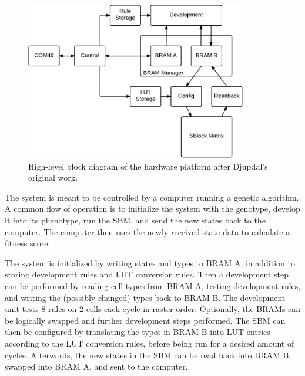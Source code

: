 \begin{figure}[!ht]
    \centering
    \includegraphics[width=0.86\textwidth]{figures/overview-djupdal}
    \caption[Djupdal's hardware design]{
        High-level block diagram of the hardware platform after Djupdal's original work.
    }
    \label{fig:overview-djupdal}
\end{figure}

The system is meant to be controlled by a computer running a genetic algorithm.
A common flow of operation is to initialize the system with the genotype, develop it into its phenotype, run the SBM, and send the new states back to the computer.
The computer then uses the newly received state data to calculate a fitness score.

The system is initialized by writing states and types to BRAM A, in addition to storing development rules and LUT conversion rules.
Then a development step can be performed by reading cell types from BRAM A\footnotemark, testing development rules, and writing the (possibly changed) types back to BRAM B.
The development unit tests 8 rules on 2 cells each cycle in raster order.
Optionally, the BRAMs can be logically swapped and further development steps performed.
The SBM can then be configured by translating the types in BRAM B into LUT entries according to the LUT conversion rules, before being run for a desired amount of cycles.
Afterwards, the new states in the SBM can be read back into BRAM B, swapped into BRAM A, and sent to the computer.

